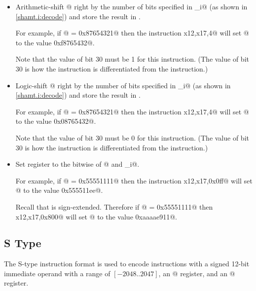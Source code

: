 \begin{itemize}
\item{}
\label{insn:srai}

Arithmetic-shift @ right by the number of bits specified in \verb@shamt_i@
(as shown in \autoref{shamt.i:decode})
and store the result in \verb@rd@.

For example, if @ = \verb@0x87654321@ then the instruction
\verb@srai x12,x17,4@ will set @ to the value \verb@0xf8765432@.

Note that the value of bit 30 must be 1 for this instruction.
(The value of bit 30 is how the \verb@srai@ instruction is differentiated
from the \verb@srli@ instruction.)

\item{}
\label{insn:srli}

Logic-shift @ right by the number of bits specified in \verb@shamt_i@
(as shown in \autoref{shamt.i:decode})
and store the result in \verb@rd@.

For example, if @ = \verb@0x87654321@ then the instruction
\verb@srli x12,x17,4@ will set @ to the value \verb@0x08765432@.

Note that the value of bit 30 must be 0 for this instruction.
(The value of bit 30 is how the \verb@srli@ instruction is differentiated
from the \verb@srai@ instruction.)

\item{}
\label{insn:xori}

Set register \verb@rd@ to the bitwise \verb@xor@ of @ and \verb@imm_i@.

For example, if @ = \verb@0x55551111@ then the instruction
\verb@xori x12,x17,0x0ff@ will set @ to the value \verb@0x555511ee@.

Recall that \verb@imm@ is sign-extended.
Therefore if @ = \verb@0x55551111@ then
\verb@xori x12,x17,0x800@ will set @ to the value \verb@0xaaaae911@.

\end{itemize}

\subsection{S Type}
\label{insnformat:stype}

The S-type instruction format is used to encode instructions with a
signed 12-bit immediate operand with a range of $[-2048..2047]$,
an @ register, and an @ register.

